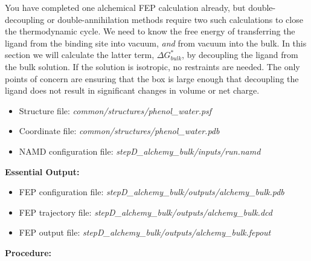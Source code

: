 \documentclass[9pt,tutorial]{Styling/livecoms}
\newcommand{\filepath}[1]{\textit{#1}}
\begin{document}
\label{step:bulkDecoupling}
    \begin{tcolorbox}[colback=blue!5!white,colframe=blue!75!black]
    You have completed one alchemical FEP calculation already, but double-decoupling or double-annihilation methods require two such calculations to close the thermodynamic cycle. We need to know the free energy of transferring the ligand from the binding site into vacuum, {\it and} from vacuum into the bulk.  In this section we will calculate the latter term, $\Delta G_{bulk}^*$, by decoupling the ligand from the bulk solution. If the solution is isotropic, no restraints are needed. The only points of concern are ensuring that the box is large enough that decoupling the ligand does not result in significant changes in volume or net charge.
    \end{tcolorbox}
    \begin{itemize}
        \item Structure file: \filepath{common/structures/phenol\_water.psf} 
        \item Coordinate file: \filepath{common/structures/phenol\_water.pdb}
        \item NAMD configuration file: \filepath{stepD\_alchemy\_bulk/inputs/run.namd}
    \end{itemize}
    \textbf{Essential Output:}
    \begin{itemize}
        \item FEP configuration file: \filepath{stepD\_alchemy\_bulk/outputs/alchemy\_bulk.pdb}
        \item FEP trajectory file: \filepath{stepD\_alchemy\_bulk/outputs/alchemy\_bulk.dcd}
        \item FEP output file: \filepath{stepD\_alchemy\_bulk/outputs/alchemy\_bulk.fepout}
    \end{itemize}
    \textbf{Procedure:}
\end{document}
